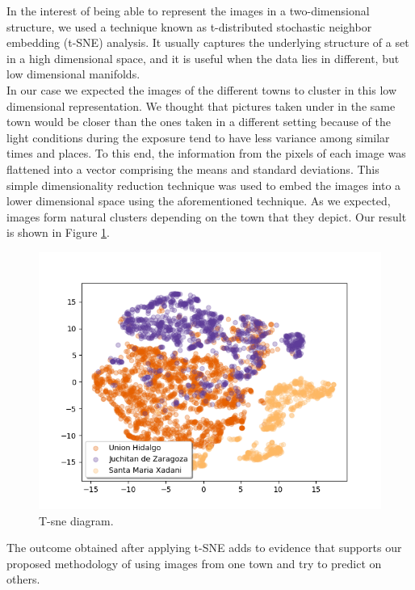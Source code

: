 In the interest of being able to represent the images in a two-dimensional structure, we used a technique known as t-distributed stochastic neighbor embedding (t-SNE) analysis. It usually captures the underlying structure of a set in a high dimensional space, and it is useful when the data lies in different, but low dimensional manifolds.\\

In our case we expected the images of the different towns to cluster in this low dimensional representation. We thought that pictures taken under in the same town would be closer than the ones taken in a different setting because of the light conditions during the exposure tend to have less variance among similar times and places. To this end, the information from the pixels of each image was flattened into a vector comprising the means and standard deviations. This simple dimensionality reduction technique was used to embed the images into a lower dimensional space using the aforementioned technique. As we expected, images form natural clusters depending on the town that they depict. Our result is shown in Figure \ref{fig:tsne}.\\

\begin{figure}[h]
  \centering
  \includegraphics[width=1\textwidth]{images/t-sne.png}
  \caption{T-sne diagram.}
  \label{fig:tsne}
\end{figure}

The outcome obtained after applying t-SNE adds to evidence that supports our proposed methodology of using images from one town and try to predict on others.\\

